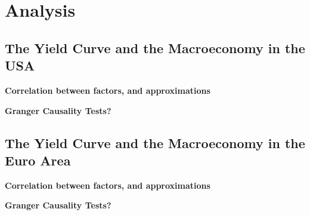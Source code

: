 \section{Analysis}
\label{sec:analysis}

\subsection{The Yield Curve and the Macroeconomy in the USA}
\label{sec:analysis_us}

\textbf{Correlation between factors, and approximations}

\textbf{Granger Causality Tests?}

\subsection{The Yield Curve and the Macroeconomy in the Euro Area}
\label{sec:analysis_ea}

\textbf{Correlation between factors, and approximations}

\textbf{Granger Causality Tests?}